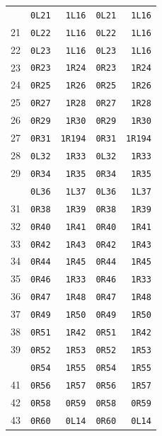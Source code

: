 \begin{longtable}{@{}r r r r r@{}}
\addlinespace[3pt]
20 & \texttt{0L21} & \texttt{1L16} & \texttt{0L21} & \texttt{1L16}\\
21 & \texttt{0L22} & \texttt{1L16} & \texttt{0L22} & \texttt{1L16}\\
22 & \texttt{0L23} & \texttt{1L16} & \texttt{0L23} & \texttt{1L16}\\
23 & \texttt{0R23} & \texttt{1R24} & \texttt{0R23} & \texttt{1R24}\\
24 & \texttt{0R25} & \texttt{1R26} & \texttt{0R25} & \texttt{1R26}\\
25 & \texttt{0R27} & \texttt{1R28} & \texttt{0R27} & \texttt{1R28}\\
26 & \texttt{0R29} & \texttt{1R30} & \texttt{0R29} & \texttt{1R30}\\
27 & \texttt{0R31} & \texttt{1R194} & \texttt{0R31} & \texttt{1R194}\\
28 & \texttt{0L32} & \texttt{1R33} & \texttt{0L32} & \texttt{1R33}\\
29 & \texttt{0R34} & \texttt{1R35} & \texttt{0R34} & \texttt{1R35}\\
\addlinespace[3pt]
30 & \texttt{0L36} & \texttt{1L37} & \texttt{0L36} & \texttt{1L37}\\
31 & \texttt{0R38} & \texttt{1R39} & \texttt{0R38} & \texttt{1R39}\\
32 & \texttt{0R40} & \texttt{1R41} & \texttt{0R40} & \texttt{1R41}\\
33 & \texttt{0R42} & \texttt{1R43} & \texttt{0R42} & \texttt{1R43}\\
34 & \texttt{0R44} & \texttt{1R45} & \texttt{0R44} & \texttt{1R45}\\
35 & \texttt{0R46} & \texttt{1R33} & \texttt{0R46} & \texttt{1R33}\\
36 & \texttt{0R47} & \texttt{1R48} & \texttt{0R47} & \texttt{1R48}\\
37 & \texttt{0R49} & \texttt{1R50} & \texttt{0R49} & \texttt{1R50}\\
38 & \texttt{0R51} & \texttt{1R42} & \texttt{0R51} & \texttt{1R42}\\
39 & \texttt{0R52} & \texttt{1R53} & \texttt{0R52} & \texttt{1R53}\\
\addlinespace[3pt]
40 & \texttt{0R54} & \texttt{1R55} & \texttt{0R54} & \texttt{1R55}\\
41 & \texttt{0R56} & \texttt{1R57} & \texttt{0R56} & \texttt{1R57}\\
42 & \texttt{0R58} & \texttt{0R59} & \texttt{0R58} & \texttt{0R59}\\
43 & \texttt{0R60} & \texttt{0L14} & \texttt{0R60} & \texttt{0L14}\\

\end{longtable}
